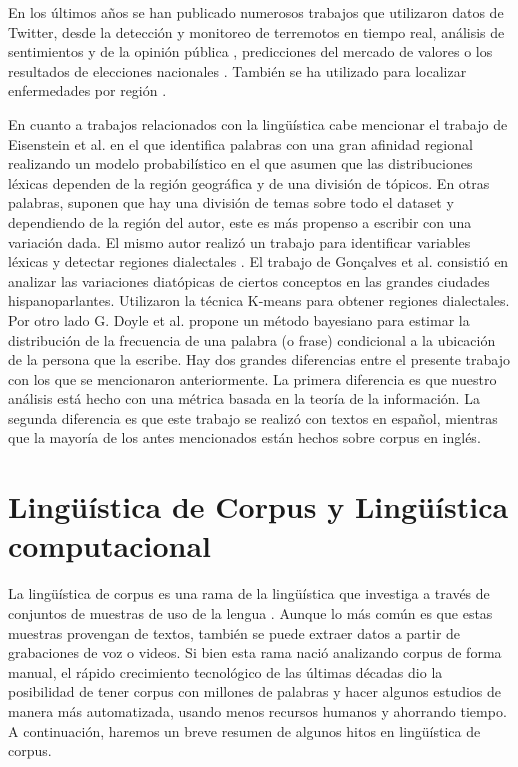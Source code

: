 En los últimos años se han publicado numerosos trabajos que utilizaron datos de Twitter, desde la detección y monitoreo de terremotos en tiempo real\cite{sakaki2010earthquake}, análisis de sentimientos y de la opinión pública \cite{liu2012sentiment},  predicciones del mercado de valores \cite{pak2010twitter} o los resultados de elecciones nacionales \cite{tumasjan2010predicting}. También se ha utilizado para localizar enfermedades por región \cite{paul2011you}.

En cuanto a trabajos relacionados con la lingüística cabe mencionar el trabajo de Eisenstein et al. \cite{eisenstein2010latent} en el que identifica palabras con una gran afinidad regional realizando un modelo probabilístico en el que asumen que las distribuciones léxicas dependen de la región geográfica y de una división de tópicos. En otras palabras, suponen que hay una división de temas sobre todo el dataset y dependiendo de la región del autor, este es más propenso a escribir con una variación dada. El mismo autor realizó un trabajo para identificar variables léxicas y detectar regiones dialectales \cite{eisenstein2014identifying}.
El trabajo de Gonçalves et al. \cite{gonccalves2014crowdsourcing} consistió en analizar las variaciones diatópicas de ciertos conceptos en las grandes ciudades hispanoparlantes. Utilizaron la técnica K-means \cite{bishop2006pattern} para obtener regiones dialectales. Por otro lado G. Doyle et al. \cite{doyle2014mapping} propone un método bayesiano para estimar la distribución de la frecuencia de una palabra (o frase) condicional a la ubicación de la persona que la escribe.
Hay dos grandes diferencias entre el presente trabajo con los que se mencionaron anteriormente. La primera diferencia es que nuestro análisis está hecho con una métrica basada en la teoría de la información. La segunda diferencia es que este trabajo se realizó con textos en español, mientras que la mayoría de los antes mencionados están hechos sobre corpus en inglés. 


\section{Lingüística de Corpus y Lingüística computacional} %
\label{linguistica_computacional}

La lingüística de corpus es una rama de la lingüística que investiga a través de conjuntos de muestras de uso de la lengua \cite{mcenery2011corpus}. Aunque lo más común es que estas muestras provengan de textos, también se puede extraer datos a partir de grabaciones de voz o videos. Si bien esta rama nació analizando corpus de forma manual, el rápido crecimiento
tecnológico de las últimas décadas dio la posibilidad de tener corpus con millones de palabras y hacer algunos estudios de manera más automatizada, usando menos recursos humanos y ahorrando tiempo. A continuación, haremos un breve resumen de algunos hitos en lingüística de corpus.

